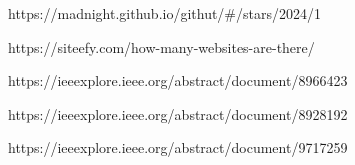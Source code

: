 \renewcommand{\section}[2]{\anonsection{Библиографический список}}




\label{sec:bibliography}

https://madnight.github.io/githut/\#/stars/2024/1

https://siteefy.com/how-many-websites-are-there/

https://ieeexplore.ieee.org/abstract/document/8966423

https://ieeexplore.ieee.org/abstract/document/8928192

https://ieeexplore.ieee.org/abstract/document/9717259






\clearpage